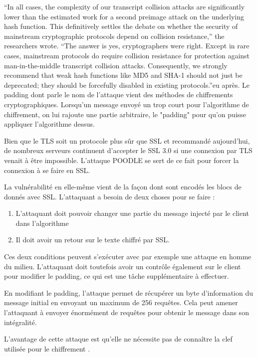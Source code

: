 “In all cases, the complexity of our transcript collision attacks are significantly lower than the estimated work for a second preimage attack on the underlying hash function. This definitively settles the debate on whether the security of mainstream cryptographic protocols depend on collision resistance,” the researchers wrote. “The answer is yes, cryptographers were right. Except in rare cases, mainstream protocols do require collision resistance for protection against man-in-the-middle transcript collision attacks. Consequently, we strongly recommend that weak hash functions like MD5 and SHA-1 should not just be deprecated; they should be forcefully disabled in existing protocols.”eu après.
Le padding dont parle le nom de l'attaque vient des méthodes de chiffrements cryptographiques. Lorsqu'un message envoyé un trop court pour l'algorithme de chiffrement, on lui rajoute une partie arbitraire, le "padding" pour qu'on puisse appliquer l'algorithme dessus.

Bien que le TLS soit un protocole plus sûr que SSL et recommandé aujourd'hui, de nombreux serveurs continuent d'accepter le SSL 3.0 si une connexion par TLS venait à être impossible. L'attaque POODLE se sert de ce fait pour forcer la connexion à se faire en SSL.

La vulnérabilité en elle-même vient de la façon dont sont encodés les blocs de donnés avec SSL. L'attaquant a besoin de deux choses pour se faire :

\begin{enumerate}
    \item L'attaquant doit pouvoir changer une partie du message injecté par le client dans l'algorithme
    \item Il doit avoir un retour sur le texte chiffré par SSL.
\end{enumerate}

Ces deux conditions peuvent s'exécuter avec par exemple une attaque en homme du milieu. L'attaquant doit toutefois avoir un contrôle également sur le client pour modifier le padding, ce qui est une tâche supplémentaire à effectuer.

En modifiant le padding, l'attaque permet de récupérer un byte d'information du message initial en envoyant un maximum de 256 requêtes. Cela peut amener l'attaquant à envoyer énormément de requêtes pour obtenir le message dans son intégralité.

L'avantage de cette attaque est qu'elle ne nécessite pas de connaître la clef utilisée pour le chiffrement \cite{poodle}.


